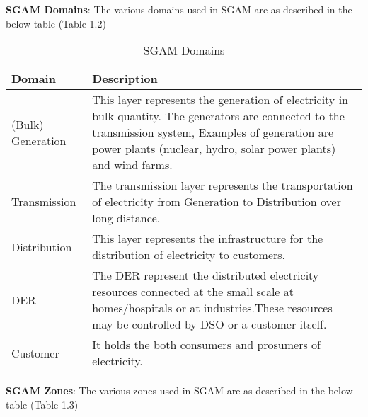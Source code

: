 \textbf{SGAM Domains}: The various domains used in SGAM are as described in the below table (Table 1.2)


\begin{table}[h!t]
	\centering
	\begin{tabular} { | l | p{11cm} | }
    \hline
		\textbf{Domain} & \textbf{Description} \\ 
		\hline
		(Bulk) Generation & This layer represents the generation of electricity in bulk quantity. The
generators are connected to the transmission system, Examples of
generation are power plants (nuclear, hydro, solar power plants) and wind
farms. \\ 
		\hline
		Transmission & The transmission layer represents the transportation of electricity from
Generation to Distribution over long distance. \\ 
        \hline
        Distribution & This layer represents the infrastructure for the distribution of electricity to
customers.\\ 
		\hline
        DER & The DER represent the distributed electricity resources connected at the
small scale at homes/hospitals or at industries.These resources may be
controlled by DSO or a customer itself. \\ 
		\hline
        Customer & It holds the both consumers and prosumers of electricity. \\ 
		\hline

	\end{tabular}
    \caption{SGAM Domains}
    \label{table:2} 
\end{table}

\textbf{SGAM Zones}: The various zones used in SGAM are as described in the below table (Table 1.3)


